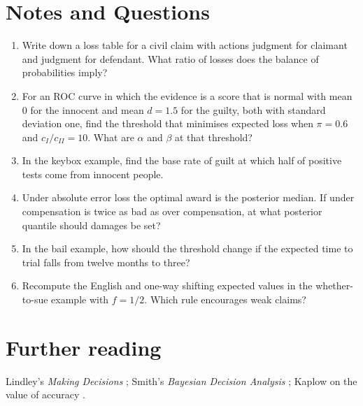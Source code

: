 \section*{Notes and Questions}
\begin{enumerate}[label=\arabic*.]
\item Write down a loss table for a civil claim with actions judgment for claimant and judgment for defendant. What ratio of losses does the balance of probabilities imply?
\item For an ROC curve in which the evidence is a score that is normal with mean $0$ for the innocent and mean $d = 1.5$ for the guilty, both with standard deviation one, find the threshold that minimises expected loss when $\pi = 0.6$ and $c_I/c_{II} = 10$. What are $\alpha$ and $\beta$ at that threshold?
\item In the keybox example, find the base rate of guilt at which half of positive tests come from innocent people.
\item Under absolute error loss the optimal award is the posterior median. If under compensation is twice as bad as over compensation, at what posterior quantile should damages be set?
\item In the bail example, how should the threshold change if the expected time to trial falls from twelve months to three?
\item Recompute the English and one-way shifting expected values in the whether-to-sue example with $f = 1/2$. Which rule encourages weak claims?
\end{enumerate}

\section*{Further reading}
Lindley's \emph{Making Decisions} \citep{lindley1985}; Smith's \emph{Bayesian Decision Analysis} \citep{smith2010}; Kaplow on the value of accuracy \citep{kaplow1994}.
